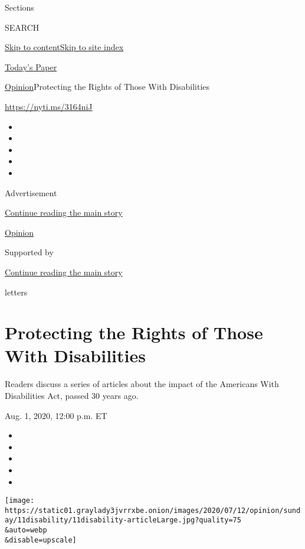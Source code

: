 Sections

SEARCH

\protect\hyperlink{site-content}{Skip to
content}\protect\hyperlink{site-index}{Skip to site index}

\href{https://myaccount.nytimes3xbfgragh.onion/auth/login?response_type=cookie\&client_id=vi}{}

\href{https://www.nytimes3xbfgragh.onion/section/todayspaper}{Today's
Paper}

\href{/section/opinion}{Opinion}\textbar{}Protecting the Rights of Those
With Disabilities

\url{https://nyti.ms/3164niJ}

\begin{itemize}
\item
\item
\item
\item
\item
\end{itemize}

Advertisement

\protect\hyperlink{after-top}{Continue reading the main story}

\href{/section/opinion}{Opinion}

Supported by

\protect\hyperlink{after-sponsor}{Continue reading the main story}

letters

\hypertarget{protecting-the-rights-of-those-with-disabilities}{%
\section{Protecting the Rights of Those With
Disabilities}\label{protecting-the-rights-of-those-with-disabilities}}

Readers discuss a series of articles about the impact of the Americans
With Disabilities Act, passed 30 years ago.

Aug. 1, 2020, 12:00 p.m. ET

\begin{itemize}
\item
\item
\item
\item
\item
\end{itemize}

\texttt{[image: https://static01.graylady3jvrrxbe.onion/images/2020/07/12/opinion/sunday/11disability/11disability-articleLarge.jpg?quality=75\\\&auto=webp\\\&disable=upscale]}


